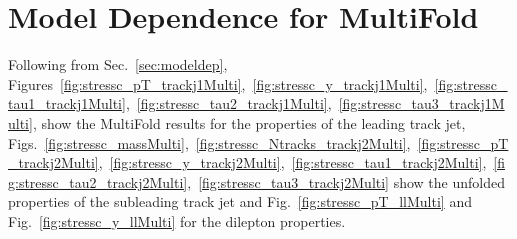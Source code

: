 \documentclass[NOTE, atlasdraft=true, texlive=2016, UKenglish]{\ATLASLATEXPATH atlasdoc}
\begin{document}
\section{Model Dependence for MultiFold}
\label{sec:stresscmultifolddet} 

Following from Sec.~\ref{sec:modeldep}, Figures~\ref{fig:stressc_pT_trackj1Multi},~\ref{fig:stressc_y_trackj1Multi},~\ref{fig:stressc_tau1_trackj1Multi},~\ref{fig:stressc_tau2_trackj1Multi},~\ref{fig:stressc_tau3_trackj1Multi}, show the MultiFold results for the properties of the leading track jet, Figs.~\ref{fig:stressc_massMulti},~\ref{fig:stressc_Ntracks_trackj2Multi},~\ref{fig:stressc_pT_trackj2Multi},~\ref{fig:stressc_y_trackj2Multi},~\ref{fig:stressc_tau1_trackj2Multi},~\ref{fig:stressc_tau2_trackj2Multi},~\ref{fig:stressc_tau3_trackj2Multi} show the unfolded properties of the subleading track jet and Fig.~\ref{fig:stressc_pT_llMulti} and Fig.~\ref{fig:stressc_y_llMulti} for the dilepton properties.

\begin{figure}[h!]
\centering
{}\\
\\
\end{figure}
\end{document}
